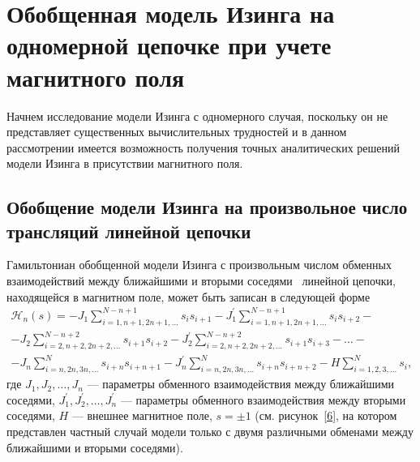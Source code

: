 \chapter{Обобщенная модель Изинга на одномерной цепочке при учете магнитного поля}\label{ch:ch2}

Начнем исследование модели Изинга с одномерного случая, поскольку он не представляет существенных вычислительных трудностей и в данном рассмотрении имеется возможность получения точных аналитических решений модели Изинга в присутствии магнитного поля.

\section{Обобщение модели Изинга на произвольное число трансляций линейной цепочки}\label{sec:ch2/sec1}

Гамильтониан обобщенной модели Изинга с произвольным числом обменных взаимодействий между ближайшими и вторыми соседями~\cite{kassan-ogly2001, dobson1969} линейной цепочки, находящейся в магнитном поле, может быть записан в следующей форме
\begin{multline}
\mathcal{H}_n(s)=-J_1\sum_{i=1,n+1,2n+1,\dots}^{N-n+1} s_i s_{i+1} - J_1^{'}\sum_{i=1,n+1,2n+1,\dots}^{N-n+1} s_i s_{i+2} -\\-J_2\sum_{i=2,n+2,2n+2,\dots}^{N-n+2} s_{i+1} s_{i+2} -J_2^{'}\sum_{i=2,n+2,2n+2,\dots}^{N-n+2} s_{i+1} s_{i+3} -\dots-\\ -J_n\sum_{i=n,2n,3n,\dots}^{N} s_{i+n} s_{i+n+1} - J_n^{'}\sum_{i=n,2n,3n,\dots}^{N} s_{i+n} s_{i+n+2} - H\sum_{i=1,2,3,\dots}^{N}s_i,
\label{1}
\end{multline}
где $J_1, J_2, \dots,  J_n$ --- параметры обменного взаимодействия между ближайшими соседями, $J^{'}_1, J^{'}_2, \dots, J^{'}_n$ --- параметры обменного взаимодействия между вторыми соседями, $H$ --- внешнее магнитное поле, $s=\pm 1$ (см. рисунок~\ref{6}, на котором представлен частный случай модели только с двумя различными обменами между ближайшими и вторыми соседями).


